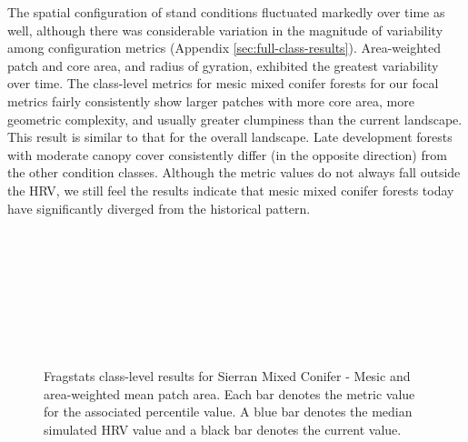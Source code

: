 The spatial configuration of stand conditions fluctuated markedly over time as well, although there was considerable variation in the magnitude of variability among configuration metrics (Appendix \ref{sec:full-class-results}). Area-weighted patch and core area, and radius of gyration, exhibited the greatest variability over time. The class-level metrics for mesic mixed conifer forests for our focal metrics fairly consistently show larger patches with more core area, more geometric complexity, and usually greater clumpiness than the current landscape. This result is similar to that for the overall landscape. Late development forests with moderate canopy cover consistently differ (in the opposite direction) from the other condition classes.  Although the metric values do not always fall outside the HRV, we still feel the results indicate that mesic mixed conifer forests today have significantly diverged from the historical pattern. 

\begin{figure}[!htbp]
  \\%
  \\%
    \\%
    \\%
    \\%
    \\%
    \\%
  \caption{Fragstats class-level results for Sierran Mixed Conifer - Mesic and area-weighted mean patch area. Each bar denotes the metric value for the associated percentile value. A blue bar denotes the median simulated HRV value and a black bar denotes the current value.}
  \label{fig:smcm_areaam}
\end{figure}

